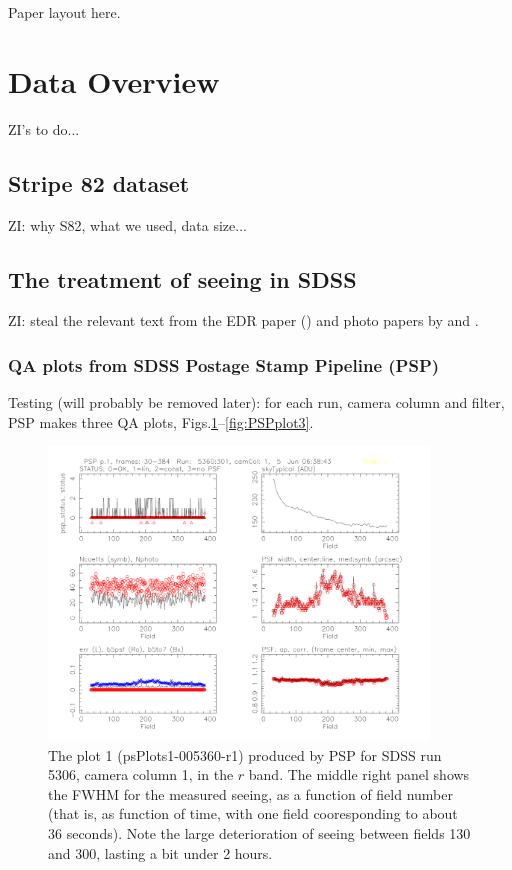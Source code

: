 \documentclass[12pt,preprint]{aastex}
\begin{document}
Paper layout here.


\section{Data Overview} 

ZI's to do... 

\subsection{Stripe 82 dataset} 

ZI: why S82, what we used, data size...


\subsection{The treatment of seeing in SDSS}

ZI: steal the relevant text from the EDR paper (\citet{SDSSEDR}) and photo papers by \cite{Lupton2001} 
and \cite{Lupton2002}. 


\subsubsection{QA plots from SDSS Postage Stamp Pipeline (PSP)}

Testing (will probably be removed later): for each run, camera column and filter, PSP makes three QA plots, 
Figs.\ref{fig:PSPplot1}--\ref{fig:PSPplot3}. 


\begin{figure}
\centering
\includegraphics[width=0.9\textwidth]{FIGURES/psPlots1-005360-r1.pdf}
\caption{The plot 1 (psPlots1-005360-r1) produced by PSP for SDSS run 5306, 
camera column 1, in the $r$ band. The middle right panel shows the FWHM for
the measured seeing, as a function of field number (that is, as  function of time, 
with one field cooresponding to about 36 seconds). Note the large deterioration
of seeing between fields 130 and 300, lasting a bit under 2 hours. 
\label{fig:PSPplot1}}
\end{figure}
\end{document}
